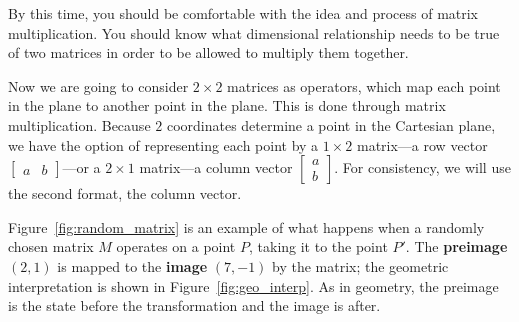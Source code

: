\documentclass[../gatm.tex]{subfiles}
\begin{document}
By this time, you should be comfortable with the idea and process of matrix multiplication. You should know what dimensional relationship needs to be true of two matrices in order to be allowed to multiply them together.

Now we are going to consider $2\times 2$ matrices as operators, which map each point in the plane to another point in the plane. This is done through matrix multiplication. Because $2$ coordinates determine a point in the Cartesian plane, we have the option of representing each point by a $1\times 2$ matrix---a row vector $\left[\begin{array}{cc}a & b \end{array}\right]$---or a $2\times 1$ matrix---a column vector $\left[\begin{smallmatrix}a \\ b \end{smallmatrix}\right]$. For consistency, we will use the second format, the column vector.

Figure~\ref{fig:random_matrix} is an example of what happens when a randomly chosen matrix $M$ operates on a point $P$, taking it to the point $P'$. The \textbf{preimage} $(2,1)$ is mapped to the \textbf{image} $(7, -1)$ by the matrix; the geometric interpretation is shown in Figure~\ref{fig:geo_interp}. As in geometry, the preimage is the state before the transformation and the image is after.

\end{document}
